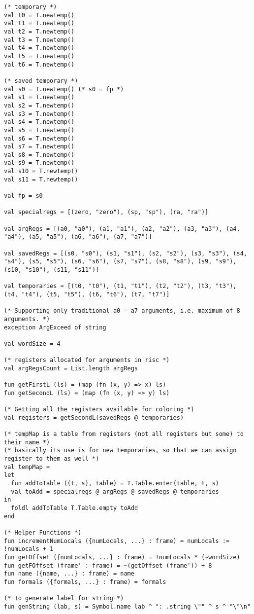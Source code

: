 \begin{verbatim}
(* temporary *)
val t0 = T.newtemp()
val t1 = T.newtemp()
val t2 = T.newtemp()
val t3 = T.newtemp()
val t4 = T.newtemp()
val t5 = T.newtemp()
val t6 = T.newtemp()

(* saved temporary *)
val s0 = T.newtemp() (* s0 = fp *)
val s1 = T.newtemp()
val s2 = T.newtemp()
val s3 = T.newtemp()
val s4 = T.newtemp()
val s5 = T.newtemp()
val s6 = T.newtemp()
val s7 = T.newtemp()
val s8 = T.newtemp()
val s9 = T.newtemp()
val s10 = T.newtemp()
val s11 = T.newtemp()

val fp = s0 

val specialregs = [(zero, "zero"), (sp, "sp"), (ra, "ra")]

val argRegs = [(a0, "a0"), (a1, "a1"), (a2, "a2"), (a3, "a3"), (a4, "a4"), (a5, "a5"), (a6, "a6"), (a7, "a7")]

val savedRegs = [(s0, "s0"), (s1, "s1"), (s2, "s2"), (s3, "s3"), (s4, "s4"), (s5, "s5"), (s6, "s6"), (s7, "s7"), (s8, "s8"), (s9, "s9"), (s10, "s10"), (s11, "s11")]

val temporaries = [(t0, "t0"), (t1, "t1"), (t2, "t2"), (t3, "t3"), (t4, "t4"), (t5, "t5"), (t6, "t6"), (t7, "t7")] 

(* Supporting only traditional a0 - a7 arguments, i.e. maximum of 8 arguments. *)
exception ArgExceed of string

val wordSize = 4

(* registers allocated for arguments in risc *)
val argRegsCount = List.length argRegs

fun getFirstL (ls) = (map (fn (x, y) => x) ls)
fun getSecondL (ls) = (map (fn (x, y) => y) ls)

(* Getting all the registers available for coloring *)
val registers = getSecondL(savedRegs @ temporaries) 

(* tempMap is a table from registers (not all registers but some) to their name *)
(* basically its use is for new temporaries, so that we can assign register to them as well *)
val tempMap = 
let
  fun addToTable ((t, s), table) = T.Table.enter(table, t, s)
  val toAdd = specialregs @ argRegs @ savedRegs @ temporaries
in
  foldl addToTable T.Table.empty toAdd
end

(* Helper Functions *)
fun incrementNumLocals ({numLocals, ...} : frame) = numLocals := !numLocals + 1
fun getOffset ({numLocals, ...} : frame) = !numLocals * (~wordSize) 
fun getFOffset (frame' : frame) = ~(getOffset (frame')) + 8
fun name ({name, ...} : frame) = name
fun formals ({formals, ...} : frame) = formals

(* To generate label for string *)
fun genString (lab, s) = Symbol.name lab ^ ": .string \"" ^ s ^ "\"\n"


\end{verbatim}
